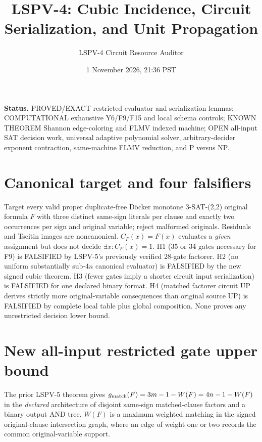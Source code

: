 \documentclass[11pt]{article}
\title{LSPV-4: Cubic Incidence, Circuit Serialization, and Unit Propagation}
\author{LSPV-4 Circuit Resource Auditor}
\date{1 November 2026, 21:36 PST}
\begin{document}
\maketitle
\noindent\textbf{Status.} PROVED/EXACT restricted evaluator and serialization lemmas; COMPUTATIONAL exhaustive Y6/F9/F15 and local schema controls; KNOWN THEOREM Shannon edge-coloring and FLMV indexed machine; OPEN all-input SAT decision work, universal adaptive polynomial solver, arbitrary-decider exponent contraction, same-machine FLMV reduction, and P versus NP.

\section{Canonical target and four falsifiers}
Target every valid proper duplicate-free D\"ocker monotone 3-SAT-(2,2) original formula $F$ with three distinct same-sign literals per clause and exactly two occurrences per sign and original variable; reject malformed originals. Residuals and Tseitin images are noncanonical. $C_F(x)=F(x)$ evaluates a \emph{given} assignment but does not decide $\exists x:C_F(x)=1$.
H1 (35 or 34 gates necessary for F9) is FALSIFIED by LSPV-5's previously verified 28-gate factorer. H2 (no uniform substantially sub-$4n$ canonical evaluator) is FALSIFIED by the new signed cubic theorem. H3 (fewer gates imply a shorter circuit input serialization) is FALSIFIED for one declared binary format. H4 (matched factorer circuit UP derives strictly more original-variable consequences than original source UP) is FALSIFIED by complete local table plus global composition. None proves any unrestricted decision lower bound.

\section{New all-input restricted gate upper bound}
The prior LSPV-5 theorem gives $g_{\rm match}(F)=3m-1-W(F)=4n-1-W(F)$ in the \emph{declared} architecture of disjoint same-sign matched-clause factors and a binary output AND tree. $W(F)$ is a maximum weighted matching in the signed original-clause intersection graph, where an edge of weight one or two records the common original-variable support.
\end{document}
